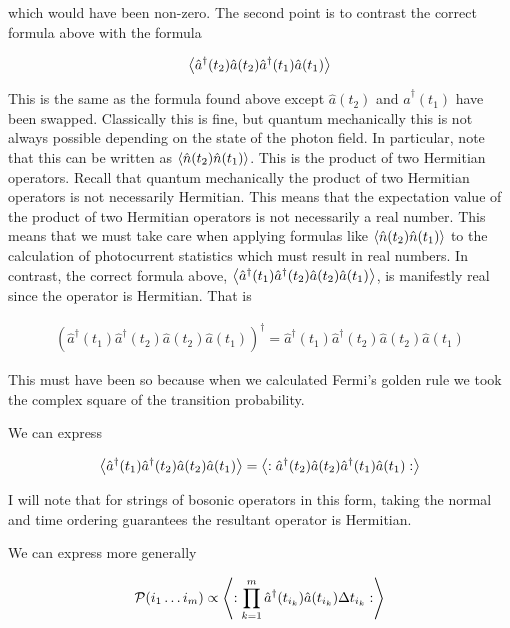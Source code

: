 \documentclass[12pt]{article}
\begin{document}
which would have been non-zero. The second point is to contrast the correct formula above with the formula

\begin{align}
\Braket{\hat{a}^{\dag}(t_2)\hat{a}(t_2) \hat{a}^{\dag}(t_1)\hat{a}(t_1)}
\end{align}

This is the same as the formula found above except $\hat{a}(t_2)$ and $\hat{a}^{\dag}(t_1)$ have been swapped. Classically this is fine, but quantum mechanically this is not always possible depending on the state of the photon field. 
In particular, note that this can be written as $\Braket{\hat{n}(t_2)\hat{n}(t_1)}$. This is the product of two Hermitian operators. Recall that quantum mechanically the product of two Hermitian operators is not necessarily Hermitian. This means that the expectation value of the product of two Hermitian operators is not necessarily a real number. This means that we must take care when applying formulas like $\Braket{\hat{n}(t_2)\hat{n}(t_1)}$ to the calculation of photocurrent statistics which must result in real numbers. In contrast, the correct formula above, $\Braket{\hat{a}^{\dag}(t_1)\hat{a}^{\dag}(t_2)\hat{a}(t_2)\hat{a}(t_1)}$, is manifestly real since the operator is Hermitian. That is 

\begin{align}
\left(\hat{a}^{\dag}(t_1)\hat{a}^{\dag}(t_2)\hat{a}(t_2)\hat{a}(t_1)\right)^{\dag} = \hat{a}^{\dag}(t_1)\hat{a}^{\dag}(t_2)\hat{a}(t_2)\hat{a}(t_1)
\end{align}

This must have been so because when we calculated Fermi's golden rule we took the complex square of the transition probability.

We can express

\begin{align}
\Braket{\hat{a}^{\dag}(t_1)\hat{a}^{\dag}(t_2)\hat{a}(t_2)\hat{a}(t_1)} = \Braket{:\hat{a}^{\dag}(t_2)\hat{a}(t_2) \hat{a}^{\dag}(t_1)\hat{a}(t_1):}
\end{align}

I will note that for strings of bosonic operators in this form, taking the normal and time ordering guarantees the resultant operator is Hermitian. 

We can express more generally

\begin{align}
\mathcal{P}(i_1 \ldots i_m) \propto \Braket{:\prod_{k=1}^m \hat{a}^{\dag}(t_{i_k})\hat{a}(t_{i_k})\Delta t_{i_k} :}
\end{align}
\end{document}
